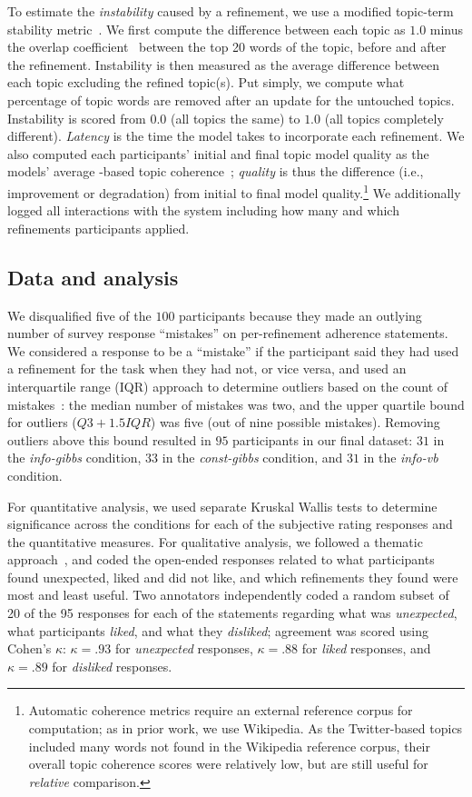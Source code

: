 To estimate the \textit{instability} caused by a refinement, we use a modified topic-term stability metric~\cite{belford2018stability}. We first compute the difference between each topic as $1.0$ minus the overlap coefficient~\cite{M.K2016AMining} between the top 20 words of the topic, before and after the refinement. Instability is then measured as the average difference between each topic excluding the refined topic(s). Put simply, we compute what percentage of topic words are removed after an update for the untouched topics. Instability is scored from $0.0$ (all topics the same) to $1.0$ (all topics completely different). 
\textit{Latency} is the time the model takes to incorporate each refinement. 
We also computed each participants' initial and final topic model quality as the models' average
\npmi{}-based topic coherence~\cite{Lau2014MachineQuality}; \textit{quality} is thus the difference (i.e., improvement or degradation) from initial to final model quality.\footnote{Automatic coherence metrics require an external reference corpus for \npmi{} computation; as in prior work, we use Wikipedia.  As the Twitter-based topics included many words not found in the
Wikipedia reference corpus, their overall topic coherence scores were
relatively low, but are still useful for \emph{relative} comparison.} We additionally logged all interactions with the system including how
many and which refinements participants applied.

\subsection{Data and analysis}
\label{sec:analysis}
We disqualified five of the $100$ participants because they made an outlying number of survey
response ``mistakes'' on per-refinement adherence statements. We considered a response to be a ``mistake'' if
the participant said they had used a refinement for the task when they had not, or vice versa, and
used an interquartile range (IQR) approach to determine outliers based on the count of mistakes~\cite{Tukey1977ExploratorySection}: the median
number of mistakes was two, and the upper
quartile bound for outliers ($Q3 + 1.5IQR$) was five (out of nine
possible mistakes). Removing outliers above this bound resulted in $95$ participants in our final dataset: $31$ in the \textit{info-gibbs} condition, $33$ in the
\textit{const-gibbs} condition, and $31$ in the \textit{info-vb}
condition.  

For quantitative analysis, we used separate Kruskal Wallis tests to determine significance across the conditions for each of the subjective rating responses and the quantitative measures. For qualitative analysis, we followed a thematic
approach~\cite{Braun2006UsingPsychology}, and coded the open-ended responses related to what participants found unexpected, liked and did not like, and which refinements they found were most and least useful. Two annotators independently coded a random subset of 20 of the 95 responses for each of the statements regarding what was \textit{unexpected}, what participants \textit{liked}, and what they \textit{disliked}; agreement was scored using Cohen's $\kappa$: $\kappa=.93$ for \textit{unexpected} responses, $\kappa=.88$ for \textit{liked} responses, and $\kappa=.89$ for \textit{disliked} responses.
